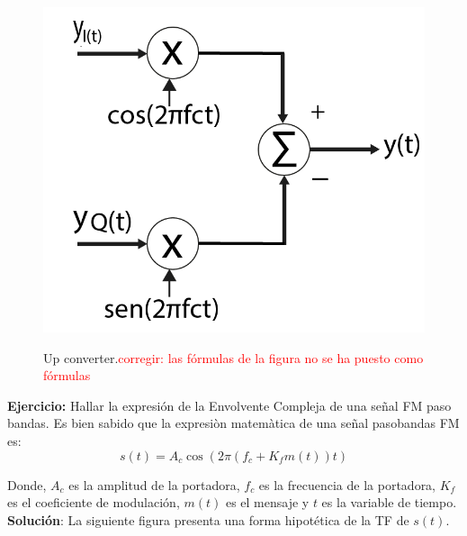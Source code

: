 \vspace{200px}
\begin{figure}[h!]
	\captionsetup{justification = raggedright, singlelinecheck = false}
	\caption{Up converter.\textcolor{red}{corregir: las fórmulas de la figura no se ha puesto como fórmulas}} 
	\centering
	\includegraphics[scale=0.3]{Imagenes/Up.png}
	\label{fig:Up}
\end{figure}

\textbf{Ejercicio:} Hallar la expresión de la Envolvente Compleja de una señal FM paso bandas. Es bien sabido que la expresiòn matemàtica de una señal pasobandas FM es:\\

	\begin{equation} \label{capdos_cinco}
		s(t)= A_{c}\cos(2\pi(f_{c}+K_{f}m(t))t )  %
	\end{equation}

Donde, $A_{c}$ es la amplitud de la portadora, $f_{c}$ es la frecuencia de la portadora, $K_{f}$ es el coeficiente de modulación, $m(t)$ es el mensaje y $t$ es la variable de tiempo.\\

\textbf{Solución}: La siguiente figura presenta una forma hipotética de la TF de $s(t)$.\\

